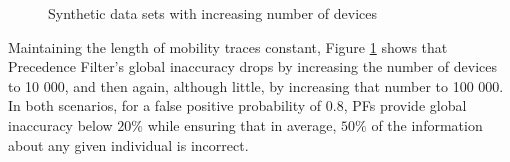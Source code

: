 \begin{figure}[htb]
\hspace*{-0.7em}
\hspace*{-0.7em}
\caption{Synthetic data sets with increasing number of devices}
\label{fig:perf_results_sim_device_number}
\end{figure}
Maintaining the length of mobility traces constant, Figure \ref{fig:perf_results_sim_device_number} shows that Precedence
Filter's global inaccuracy drops by increasing the number of devices
to 10 000, and then again, although little, by increasing that number
to 100 000. In both scenarios, for a false positive probability of
$0.8$, PFs provide global inaccuracy below $20\%$ while ensuring that
in average, $50\%$ of the information about any given individual is
incorrect.


